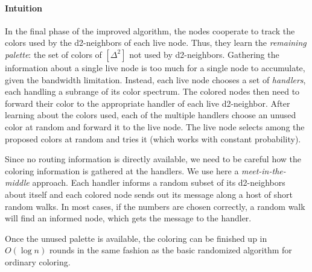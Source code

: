 \paragraph*{Intuition}
In the final phase of the improved algorithm, the nodes cooperate to track the colors used by the d2-neighbors of each live node. Thus, they learn the \emph{remaining palette}: the set of colors of $[\Delta^2]$ not used by d2-neighbors. Gathering the information about a single live node is too much for a single node to accumulate, given the bandwidth limitation. Instead, each live node chooses a set of \emph{handlers}, each handling a subrange of its color spectrum. The colored nodes then need to forward their color to the appropriate handler of each live d2-neighbor. After learning about the colors used, each of the multiple handlers choose an unused color at random and forward it to the live node. The live node selects among the proposed colors at random and tries it (which works with constant probability).

Since no routing information is directly available, we need to be careful how the coloring information is gathered at the handlers. We use here a \emph{meet-in-the-middle} approach. Each handler informs a random subset of its d2-neighbors about itself and each colored node sends out its message along a host of short random walks. In most cases, if the numbers are chosen correctly, a random walk will find an informed node, which gets the message to the handler. 

Once the unused palette is available, the coloring can be finished up in $O(\log n)$ rounds in the same fashion as the basic randomized {\congest} algorithm for ordinary coloring.

